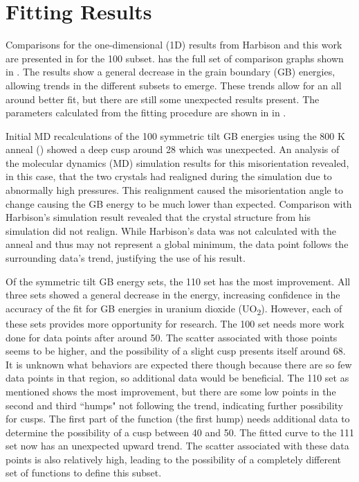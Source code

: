 \documentclass[twoside,senior]{BYUPhys}
\begin{document}
\section{Fitting Results\label{results:fit}}
Comparisons for the one-dimensional (1D) results from Harbison\cite{harbison2015} and this work are presented in  for the \textlangle{}100\textrangle{} subset.   has the full set of comparison graphs shown in .  The results show a general decrease in the grain boundary (GB) energies, allowing trends in the different subsets to emerge.  These trends allow for an all around better fit, but there are still some unexpected results present.  The parameters calculated from the fitting procedure are shown in  in .

Initial MD recalculations of the \textlangle{}100\textrangle{} symmetric tilt GB energies using the 800 K anneal () showed a deep cusp around 28\textdegree{} which was unexpected.  An analysis of the molecular dynamics (MD) simulation results for this misorientation revealed, in this case, that the two crystals had realigned during the simulation due to abnormally high pressures.  This realignment caused the misorientation angle to change causing the GB energy to be much lower than expected.  Comparison with Harbison's simulation result revealed that the crystal structure from his simulation did not realign.  While Harbison's data was not calculated with the anneal and thus may not represent a global minimum, the data point follows the surrounding data's trend, justifying the use of his result.

Of the symmetric tilt GB energy sets, the \textlangle{}110\textrangle{} set has the most improvement.  All three sets showed a general decrease in the energy, increasing confidence in the accuracy of the fit for GB energies in uranium dioxide (UO\textsubscript{2}).  However, each of these sets provides more opportunity for research.  The \textlangle{}100\textrangle{} set needs more work done for data points after around 50\textdegree{}.  The scatter associated with those points seems to be higher, and the possibility of a slight cusp presents itself around 68\textdegree{}.  It is unknown what behaviors are expected there though because there are so few data points in that region, so additional data would be beneficial.  The \textlangle{}110\textrangle{} set as mentioned shows the most improvement, but there are some low points in the second and third ``humps" not following the trend, indicating further possibility for cusps.  The first part of the function (the first hump) needs additional data to determine the possibility of a cusp between 40\textdegree{} and 50\textdegree{}.  The fitted curve to the \textlangle{}111\textrangle{} set now has an unexpected upward trend.  The scatter associated with these data points is also relatively high, leading to the possibility of a completely different set of functions to define this subset.
\end{document}
